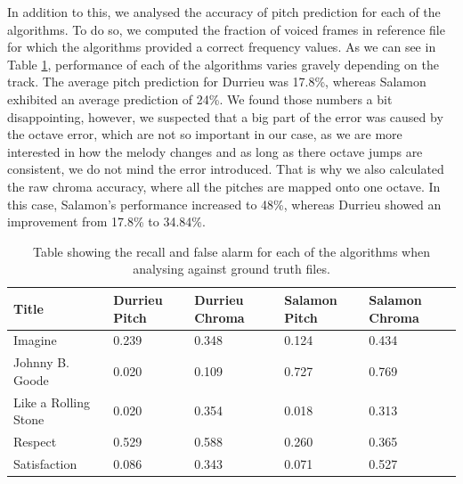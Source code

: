 In addition to this, we analysed the accuracy of pitch prediction for each of the algorithms. 
To do so, we computed the fraction of voiced frames in reference file for which the algorithms provided a correct frequency values. As we can see in Table \ref{table:melodypitchchroma}, performance of each of the algorithms varies gravely depending on the track. The average pitch prediction for Durrieu was  17.8\%, whereas Salamon exhibited an average prediction of 24\%. We found those numbers a bit disappointing, however, we suspected that a big part of the error was caused by the octave error, which are not so important in our case, as we are more interested in how the melody changes and as long as there octave jumps are consistent, we do not mind the error introduced. That is why we also calculated the raw chroma accuracy, where all the pitches are mapped onto one octave. In this case, Salamon's performance increased to 48\%, whereas Durrieu showed an improvement from 17.8\% to 34.84\%.


\begin{table}
\begin{center}
\begin{tabular} {| p{5cm}| p{1.75cm} | p{1.75cm} | p{1.75cm} | p{1.75cm} |} \hline
Title 	& Durrieu Pitch & Durrieu Chroma & Salamon Pitch & Salamon Chroma \\ \hline \hline
Imagine						& 0.239		& 0.348		& 0.124			& 0.434		\\	\hline
Johnny B. Goode		& 0.020		& 0.109		& 0.727			& 0.769		\\ 	\hline
Like a Rolling Stone	& 0.020		& 0.354		& 0.018			& 0.313		\\ 	\hline
Respect						& 0.529		& 0.588		& 0.260			& 0.365		\\ 	\hline
Satisfaction				& 0.086		& 0.343		& 0.071			& 0.527		\\	\hline
\end{tabular}
\caption{Table showing the recall and false alarm for each of the algorithms when analysing against ground truth files.}
\label{table:melodypitchchroma}
\end{center}
\end{table}

\vspace{10pt}


